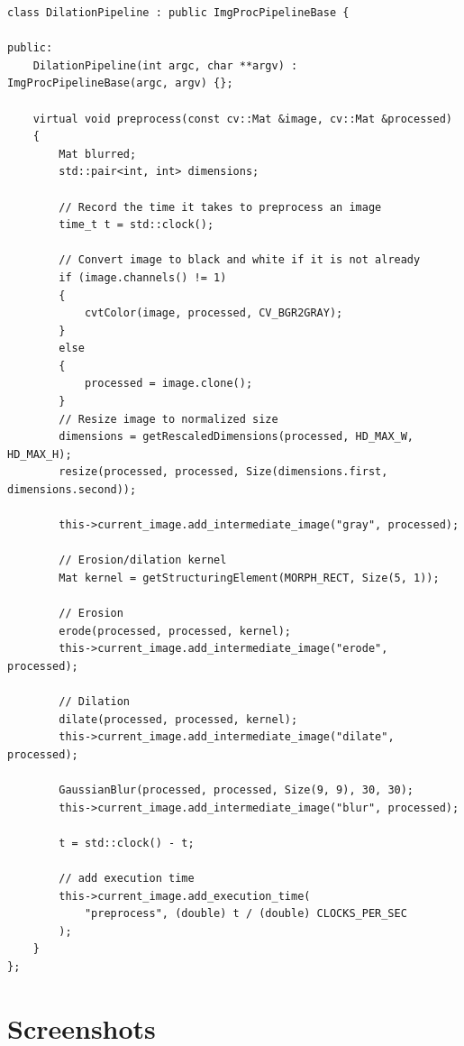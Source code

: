 \documentclass[10pt, onecolumn, draftclsnofoot, letterpaper, compsoc]{IEEEtran}
\begin{document}
\begin{verbatim}
class DilationPipeline : public ImgProcPipelineBase {

public:
    DilationPipeline(int argc, char **argv) : ImgProcPipelineBase(argc, argv) {};

    virtual void preprocess(const cv::Mat &image, cv::Mat &processed)
    {
        Mat blurred;
        std::pair<int, int> dimensions;

        // Record the time it takes to preprocess an image
        time_t t = std::clock();

        // Convert image to black and white if it is not already
        if (image.channels() != 1)
        {
            cvtColor(image, processed, CV_BGR2GRAY);
        }
        else
        {
            processed = image.clone();
        }
        // Resize image to normalized size
        dimensions = getRescaledDimensions(processed, HD_MAX_W, HD_MAX_H);
        resize(processed, processed, Size(dimensions.first, dimensions.second));

        this->current_image.add_intermediate_image("gray", processed);

        // Erosion/dilation kernel
        Mat kernel = getStructuringElement(MORPH_RECT, Size(5, 1));

        // Erosion
        erode(processed, processed, kernel);
        this->current_image.add_intermediate_image("erode", processed);

        // Dilation
        dilate(processed, processed, kernel);
        this->current_image.add_intermediate_image("dilate", processed);

        GaussianBlur(processed, processed, Size(9, 9), 30, 30);
        this->current_image.add_intermediate_image("blur", processed);

        t = std::clock() - t;

        // add execution time
        this->current_image.add_execution_time(
		    "preprocess", (double) t / (double) CLOCKS_PER_SEC
        );
    }
};
\end{verbatim}

\newpage
\section{Screenshots}
\end{document}
